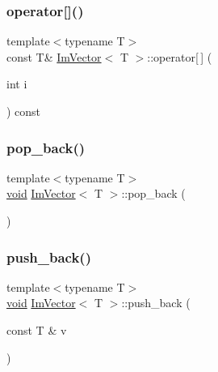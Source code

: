 \mbox{\label{structImVector_af7585c60921f739085229bb8cd78191c}} 
\subsubsection{\texorpdfstring{operator[]()}{operator[]()}\hspace{0.1cm}{\footnotesize\ttfamily [2/2]}}
{\footnotesize\ttfamily template$<$typename T$>$ \\
const T\& \hyperlink{structImVector}{Im\+Vector}$<$ T $>$\+::operator\mbox{[}$\,$\mbox{]} (\begin{DoxyParamCaption}\item[{int}]{i }\end{DoxyParamCaption}) const\hspace{0.3cm}{\ttfamily [inline]}}

\mbox{\label{structImVector_a3db7ce62d3c429effdb893fbf7148c1c}} 
\subsubsection{\texorpdfstring{pop\+\_\+back()}{pop\_back()}}
{\footnotesize\ttfamily template$<$typename T$>$ \\
\hyperlink{imgui__impl__opengl3__loader_8h_ac668e7cffd9e2e9cfee428b9b2f34fa7}{void} \hyperlink{structImVector}{Im\+Vector}$<$ T $>$\+::pop\+\_\+back (\begin{DoxyParamCaption}{ }\end{DoxyParamCaption})\hspace{0.3cm}{\ttfamily [inline]}}

\mbox{\label{structImVector_aab5df48e0711a48bd12f3206e08c4108}} 
\subsubsection{\texorpdfstring{push\+\_\+back()}{push\_back()}}
{\footnotesize\ttfamily template$<$typename T$>$ \\
\hyperlink{imgui__impl__opengl3__loader_8h_ac668e7cffd9e2e9cfee428b9b2f34fa7}{void} \hyperlink{structImVector}{Im\+Vector}$<$ T $>$\+::push\+\_\+back (\begin{DoxyParamCaption}\item[{const T \&}]{v }\end{DoxyParamCaption})\hspace{0.3cm}{\ttfamily [inline]}}

